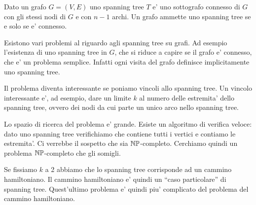 Dato un grafo $G = (V,E)$ uno spanning tree $T$ e' uno sottografo connesso di $G$ con gli stessi
nodi di $G$ e con $n-1$ archi. Un grafo ammette uno spanning tree se e solo se e' connesso.

Esistono vari problemi al riguardo agli spanning tree su grafi. Ad esempio l'esistenza di uno
spanning tree in $G$, che si riduce a capire se il grafo e' connesso, che e' un problema semplice.
Infatti ogni visita del grafo definisce implicitamente uno spanning tree. 

Il problema diventa interessante se poniamo vincoli allo spanning tree. Un vincolo interessante e',
ad esempio, dare un limite $k$ al numero delle estremita' dello spanning tree, ovvero dei nodi da
cui parte un unico arco nello spanning tree.

Lo spazio di ricerca del problema e' grande. Esiste un algoritmo di verifica veloce: dato uno
spanning tree verifichiamo che contiene tutti i vertici e contiamo le estremita'. Ci verrebbe il
sospetto che sia $\mathbb{NP}$-completo. Cerchiamo quindi un problema $\mathbb{NP}$-completo che gli
somigli. 

Se fissiamo $k$ a 2 abbiamo che lo spanning tree corrisponde ad un cammino hamiltoniano. Il cammino
hamiltoniano e' quindi un ``caso particolare'' di spanning tree. Quest'ultimo problema e' quindi
piu' complicato del problema del cammino hamiltoniano.

